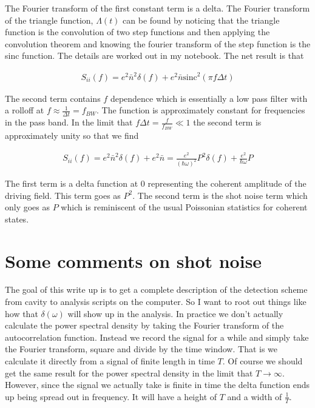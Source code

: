 \documentclass[12pt]{article}
\begin{document}
The Fourier transform of the first constant term is a delta. The Fourier transform of the triangle function, $\Lambda(t)$ can be found by noticing that the triangle function is the convolution of two step functions and then applying the convolution theorem and knowing the fourier transform of the step function is the sinc function. The details are worked out in my notebook. The net result is that

\begin{align}
S_{ii}(f) = e^2 \bar{n}^2 \delta(f) + e^2 \bar{n} \text{sinc}^2(\pi f \Delta t)
\end{align}

The second term contains $f$ dependence which is essentially a low pass filter with a rolloff at $f \approx \frac{1}{\Delta t} = f_{BW}$. The function is approximately constant for frequencies in the pass band. In the limit that $f \Delta t = \frac{f}{f_{BW}} \ll 1$ the second term is approximately unity so that we find

\begin{align}
S_{ii}(f) =  e^2 \bar{n}^2 \delta(f) + e^2 \bar{n} = \frac{e^2}{(\hbar \omega)^2} P^2 \delta(f) + \frac{e^2}{\hbar  \omega} P
\end{align}

The first term is a delta function at 0 representing the coherent amplitude of the driving field. This term goes as $P^2$. The second term is the shot noise term which only goes as $P$ which is reminiscent of the usual Poissonian statistics for coherent states.

\section{Some comments on shot noise}

The goal of this write up is to get a complete description of the detection scheme from cavity to analysis scripts on the computer. So I want to root out things like how that $\delta(\omega)$ will show up in the analysis. In practice we don't actually calculate the power spectral density by taking the Fourier transform of the autocorrelation function. Instead we record the signal for a while and simply take the Fourier transform, square and divide by the time window. That is we calculate it directly from a signal of finite length in time $T$. Of course we should get the same result for the power spectral density in the limit that $T\rightarrow \infty$. However, since the signal we actually take is finite in time the delta function ends up being spread out in frequency. It will have a height of $T$ and a width of $\frac{1}{T}$.
\end{document}
